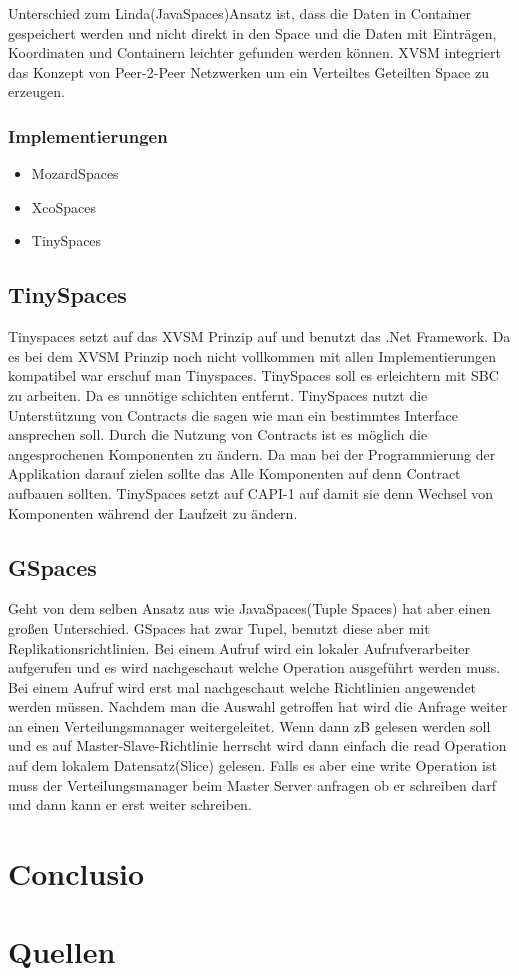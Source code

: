 \documentclass[a4paper,12pt]{scrreprt}
\begin{document}
		
		Unterschied zum Linda(JavaSpaces)Ansatz ist, dass die Daten in Container gespeichert werden und nicht direkt in den Space und die Daten mit Einträgen, Koordinaten und Containern leichter gefunden werden können.
		XVSM integriert das Konzept von Peer-2-Peer Netzwerken um ein Verteiltes Geteilten Space zu erzeugen.
		
		\subsection{Implementierungen}
			\begin{itemize}
				\item MozardSpaces
				\item XcoSpaces
				\item TinySpaces
			\end{itemize}
		
		
		\section{TinySpaces}
			Tinyspaces setzt auf das XVSM Prinzip auf und benutzt das .Net Framework. Da es bei dem XVSM Prinzip noch nicht vollkommen mit allen Implementierungen kompatibel war erschuf man Tinyspaces. 
			TinySpaces soll es erleichtern mit SBC zu arbeiten. Da es unnötige schichten entfernt. 
			TinySpaces nutzt die Unterstützung von Contracts die sagen wie man ein bestimmtes Interface ansprechen soll.
			Durch die Nutzung von Contracts ist es möglich die angesprochenen Komponenten zu ändern. Da man bei der Programmierung der Applikation darauf zielen sollte das Alle Komponenten auf denn Contract aufbauen sollten.
			TinySpaces setzt auf CAPI-1 auf damit sie denn Wechsel von Komponenten während der Laufzeit zu ändern.
		\section{GSpaces}
		Geht von dem selben Ansatz aus wie JavaSpaces(Tuple Spaces) hat aber einen großen Unterschied. GSpaces hat zwar Tupel, benutzt diese aber mit Replikationsrichtlinien.  Bei einem Aufruf wird ein lokaler Aufrufverarbeiter aufgerufen und es wird nachgeschaut welche Operation ausgeführt werden muss. Bei  einem Aufruf wird erst mal nachgeschaut welche Richtlinien angewendet werden müssen. Nachdem man die Auswahl getroffen hat wird die Anfrage weiter an einen Verteilungsmanager weitergeleitet.  Wenn dann zB gelesen werden soll und es auf Master-Slave-Richtlinie herrscht wird dann einfach die read Operation auf dem lokalem Datensatz(Slice) gelesen. Falls es aber eine write Operation ist muss der Verteilungsmanager beim Master Server anfragen ob er schreiben darf und dann kann er erst weiter schreiben.	
	
\chapter{Conclusio}

\chapter{Quellen}
\end{document}
